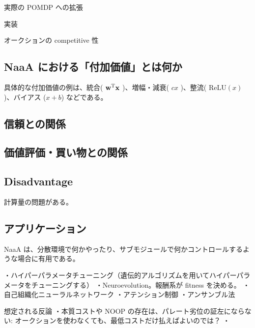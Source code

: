 実際の POMDP への拡張

実装

オークションの competitive 性

\subsection{NaaA における「付加価値」とは何か}
具体的な付加価値の例は、統合( $\mathrm{\mathbf{w}}^{\mathrm{T}} \mathrm{\mathbf{x}}$ )、増幅・減衰( $cx$ )、整流( $\mathrm{ReLU}(x)$ )、バイアス ($x+b$) などである。

\subsection{信頼との関係}
\subsection{価値評価・買い物との関係}

\subsection{Disadvantage}
計算量の問題がある。

\subsection{アプリケーション}
NaaA は、分散環境で何かやったり、サブモジュールで何かコントロールするような場合に有用である。

・ハイパーパラメータチューニング（遺伝的アルゴリズムを用いてハイパーパラメータをチューニングする）
	・Neuroevolution。報酬系が fitness を決める。
・自己組織化ニューラルネットワーク
・アテンション制御
・アンサンブル法
\fi


想定される反論
・本質コストや NOOP の存在は、パレート劣位の証左にならない: オークションを使わなくても、最低コストだけ払えばよいのでは？
・
\fi

